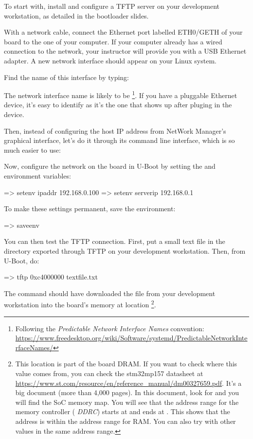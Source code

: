 To start with, install and configure a TFTP server on your development
workstation, as detailed in the bootloader slides.

With a network cable, connect the Ethernet port labelled ETH0/GETH of
your board to the one of your computer. If your computer already has a
wired connection to the network, your instructor will provide you with
a USB Ethernet adapter. A new network interface should appear on your
Linux system.

Find the name of this interface by typing:

The network interface name is likely to be
\footnote{Following the {\em Predictable Network Interface
Names} convention:
\url{https://www.freedesktop.org/wiki/Software/systemd/PredictableNetworkInterfaceNames/}}.
If you have a pluggable Ethernet device, it's easy to identify as it's
the one that shows up after pluging in the device.

Then, instead of configuring the host IP address from NetWork Manager’s graphical interface,
let’s do it through its command line interface, which is so much easier to use:


Now, configure the network on the board in U-Boot by setting the 
and  environment variables:

\begin{ubootinput}
=> setenv ipaddr 192.168.0.100
=> setenv serverip 192.168.0.1
\end{ubootinput}

To make these settings permanent, save the environment:

\begin{ubootinput}
=> saveenv
\end{ubootinput}

You can then test the TFTP connection. First, put a small text file in
the directory exported through TFTP on your development
workstation. Then, from U-Boot, do:

\begin{ubootinput}
=> tftp 0xc4000000 textfile.txt
\end{ubootinput}

The  command should have downloaded the
 file from your development workstation into
the board's memory at location \footnote{
This location is part of the board DRAM. If you want
to check where this value comes from, you can check the stm32mp157
datasheet at
\url{https://www.st.com/resource/en/reference_manual/dm00327659.pdf}.
It's a big document (more than 4,000 pages). In this document, look
for  and you will find the SoC memory map.
You will see that the address range for the memory controller ({\em
DDRC}) starts at  and ends at . This
shows that the  address is within the address range
for RAM. You can also try with other values in the same address range.}.

